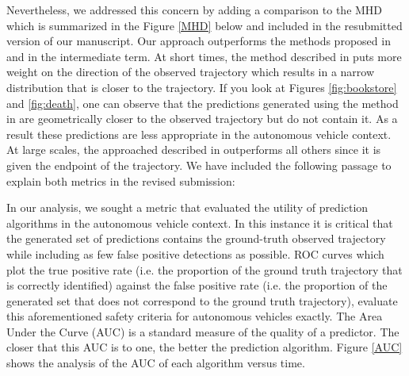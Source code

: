 \documentclass[usenames,dvipsnames]{article}
\newcommand{\Ram}[1]{{\normalsize{\textbf{({\color{green}Ram:\ }#1)}}}}
\providecommand{\response}[1]{
\noindent
\noindent\colorbox{gray!20}{
\parbox{\textwidth}{
\setlength{\parskip}{.1in}
\setlength{\parindent}{.1in}
#1}
}
}
\begin{document}
\begin{enumerate}
\begin{item}
Nevertheless, we addressed this concern by adding a comparison to the MHD which is summarized in the Figure \ref{MHD} below and included in the resubmitted version of our manuscript. 
Our approach outperforms the methods proposed in \cite{Kitani2012} and \cite{Alahi2016} in the intermediate term. 
At short times, the method described in \cite{Alahi2016} puts more weight on the direction of the observed trajectory which results in a narrow distribution that is closer to the trajectory. 
If you look at Figures \ref{fig:bookstore} and \ref{fig:death}, one can observe that the predictions generated using the method in \cite{Alahi2016} are geometrically closer to the observed trajectory but do not contain it.
As a result these predictions are less appropriate in the autonomous vehicle context.
At large scales,  the approached described in\cite{Kitani2012} outperforms all  others since it is given the endpoint of the trajectory. 
We have included the following passage to explain both metrics in the revised submission:

\reversemarginpar{}
\response{ In our analysis, we sought a metric that evaluated the utility of prediction algorithms in the autonomous vehicle context. 
	In this instance it is critical that the generated set of predictions contains the ground-truth observed trajectory while including as few false positive detections as possible.
	ROC curves which plot the true positive rate (i.e. the proportion of the ground truth trajectory that is correctly identified) against the false positive rate (i.e. the proportion of the generated set that does not correspond to the ground truth trajectory), evaluate this aforementioned safety criteria for autonomous vehicles exactly. 
	The Area Under the Curve (AUC) is a standard measure of the quality of a predictor.  
	The closer that this AUC is to one, the better the prediction algorithm.
	Figure \ref{AUC} shows the analysis of the AUC of each algorithm versus time.
	
}
\end{item}
\end{enumerate}
\end{document}
